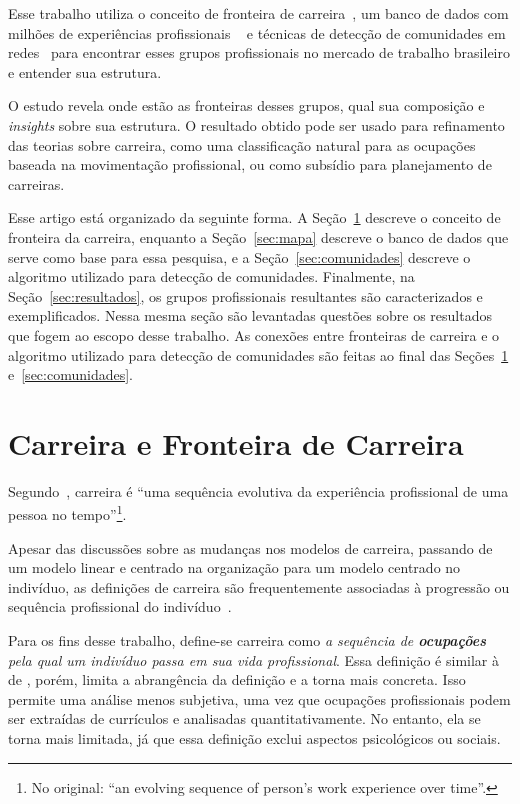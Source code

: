 \documentclass[
  article,
  11pt,
  a4paper,
  english,
  brazil,
  sumario=tradicional]{abntex2}
\begin{document}
Esse trabalho utiliza o conceito de fronteira de carreira~\cite{Gunz2007-hr}, um banco de dados com milhões de experiências profissionais ~\cite{VAGAS_Tecnologia2015-yv} e técnicas de detecção de comunidades em redes~\cite{Rosvall2009-sd} para encontrar esses grupos profissionais no mercado de trabalho brasileiro e entender sua estrutura.

O estudo revela onde estão as fronteiras desses grupos, qual sua composição e \textit{insights} sobre sua estrutura. O resultado obtido pode ser usado para refinamento das teorias sobre carreira, como uma classificação natural para as ocupações baseada na movimentação profissional, ou como subsídio para planejamento de carreiras.

Esse artigo está organizado da seguinte forma. A Seção~\ref{sec:carreira} descreve o conceito de fronteira da carreira, enquanto a Seção~\ref{sec:mapa} descreve o banco de dados que serve como base para essa pesquisa, e a Seção~\ref{sec:comunidades} descreve o algoritmo utilizado para detecção de comunidades. Finalmente, na Seção~\ref{sec:resultados}, os grupos profissionais resultantes são caracterizados e exemplificados. Nessa mesma seção são levantadas questões sobre os resultados que fogem ao escopo desse trabalho. As conexões entre fronteiras de carreira e o algoritmo utilizado para detecção de comunidades são feitas ao final das Seções~\ref{sec:carreira} e~\ref{sec:comunidades}.

\section{Carreira e Fronteira de Carreira} \label{sec:carreira}

Segundo~, carreira é \foreignquote{english}{uma sequência evolutiva da experiência profissional de uma pessoa no tempo}\footnote{No original: \enquote{an evolving sequence of person's work experience over time}.}.

Apesar das discussões sobre as mudanças nos modelos de carreira, passando de um modelo linear e centrado na organização para um modelo centrado no indivíduo, as definições de carreira são frequentemente associadas à progressão ou sequência profissional do indivíduo~\cite{Baruch2004-oy,Sullivan2009-xb,Bendassolli2009-bg}.

Para os fins desse trabalho, define-se carreira como \textit{a sequência de \textbf{ocupações} pela qual um indivíduo passa em sua vida profissional}. Essa definição é similar à de , porém, limita a abrangência da definição e a torna mais concreta. Isso permite uma análise menos subjetiva, uma vez que ocupações profissionais podem ser extraídas de currículos e analisadas quantitativamente. No entanto, ela se torna mais limitada, já que essa definição exclui aspectos psicológicos ou sociais.
\end{document}
